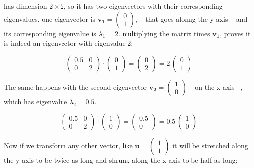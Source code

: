 \documentclass[12pt]{article}
\begin{document}
has dimension $2 \times 2$, so it has two eigenvectors with their corresponding eigenvalues. one eigenvector is $\mathbf{v_1}=\begin{pmatrix}  0\\ 1 \end{pmatrix} $,  -- that goes alonng the y-axis -- and its corresponding eigenvalue is $\lambda_1 = 2$. multiplying the matrix times $\mathbf{v_1}$, proves it is indeed an eigenvector with eigenvalue 2:

\begin{equation}
	\begin{pmatrix} 0.5 & 0\\ 0 &  2 \end{pmatrix} \cdot \begin{pmatrix}  0\\ 1 \end{pmatrix} = \begin{pmatrix}  0\\ 2 \end{pmatrix}= 2 \, \begin{pmatrix}  0\\ 1 \end{pmatrix}
\end{equation}

The same happens with the second eigenvector $\mathbf{v_2}=\begin{pmatrix}  1\\ 0 \end{pmatrix}$ -- on the x-axis --, which has eigenvalue $\lambda_2 = 0.5$.

\begin{equation}
	\begin{pmatrix} 0.5 & 0\\ 0 &  2 \end{pmatrix} \cdot \begin{pmatrix}  1\\ 0 \end{pmatrix} = \begin{pmatrix}  0.5\\ 0 \end{pmatrix}= 0.5 \, \begin{pmatrix}  1\\ 0 \end{pmatrix}
\end{equation}

Now if we transform any other vector, like $\mathbf{u}=\begin{pmatrix}  1\\ 1 \end{pmatrix}$ it will be stretched along the y-axis to be twice as long and shrunk along the x-axis to be half as long:
\end{document}
